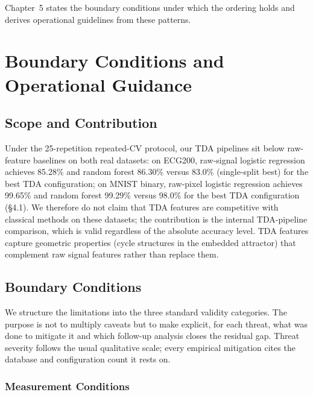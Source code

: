 \documentclass[12pt, a4paper]{report}
\theoremstyle{definition}
\theoremstyle{plain}
\theoremstyle{remark}
\begin{document}
\noindent Chapter~5 states the boundary conditions under which the
ordering holds and derives operational guidelines from these
patterns.

\newpage

\chapter{Boundary Conditions and Operational Guidance}
\label{chap:discussion}

\section{Scope and Contribution}
\label{sec:scope}

Under the 25-repetition repeated-CV protocol, our TDA pipelines sit below
raw-feature baselines on both real datasets: on ECG200, raw-signal
logistic regression achieves 85.28\% and random forest 86.30\% versus
83.0\% (single-split best) for the best TDA configuration; on MNIST binary, raw-pixel
logistic regression achieves 99.65\% and random forest 99.29\% versus
98.0\% for the best TDA configuration (\S4.1). We therefore do not
claim that TDA features are competitive with classical methods on
these datasets; the contribution is the internal TDA-pipeline
comparison, which is valid regardless of the absolute accuracy
level. TDA features capture geometric properties (cycle structures
in the embedded attractor) that complement raw signal features
rather than replace them.

\section{Boundary Conditions}
\label{sec:threats}

We structure the limitations into the three standard validity
categories. The purpose is not to multiply caveats but to make explicit,
for each threat, what was done to mitigate it and which follow-up analysis
closes the residual gap. Threat severity follows the usual qualitative
scale; every empirical mitigation cites the database and configuration
count it rests on.

\subsection{Measurement Conditions}
\label{sec:threats_construct}
\end{document}
